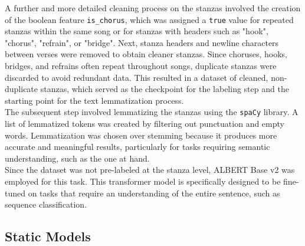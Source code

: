 A further and more detailed cleaning process on the stanzas involved the creation
of the boolean feature \texttt{is\_chorus}, which was assigned a \texttt{true}
value for repeated stanzas within the same song or for stanzas with headers such
as "hook", "chorus", "refrain", or "bridge".
Next, stanza headers and newline characters between verses were removed to obtain
cleaner stanzas.
Since choruses, hooks, bridges, and refrains often repeat throughout songs,
duplicate stanzas were discarded to avoid redundant data. This resulted in a
dataset of cleaned, non-duplicate stanzas, which served as the checkpoint for
the labeling step and the starting point for the text lemmatization process.\\

The subsequent step involved lemmatizing the stanzas using the \texttt{spaCy}
library. A list of lemmatized tokens was created by filtering out punctuation
and empty words. Lemmatization was chosen over stemming because it produces
more accurate and meaningful results, particularly for tasks requiring semantic
understanding, such as the one at hand.\\

Since the dataset was not pre-labeled at the stanza level, ALBERT Base v2 was employed for this task.
This transformer model is specifically designed to be fine-tuned on tasks that
require an understanding of the entire sentence, such as sequence classification.



\subsection*{Static Models}

